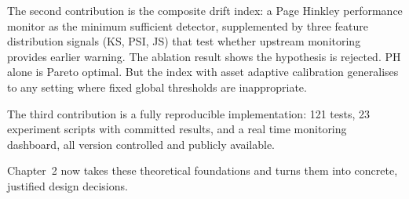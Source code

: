 The second contribution is the composite drift index: a Page Hinkley performance monitor as the minimum sufficient detector, supplemented by three feature distribution signals (KS, PSI, JS) that test whether upstream monitoring provides earlier warning. The ablation result shows the hypothesis is rejected. PH alone is Pareto optimal. But the index with asset adaptive calibration generalises to any setting where fixed global thresholds are inappropriate.

The third contribution is a fully reproducible implementation: 121 tests, 23 experiment scripts with committed results, and a real time monitoring dashboard, all version controlled and publicly available.

Chapter~2 now takes these theoretical foundations and turns them into concrete, justified design decisions.